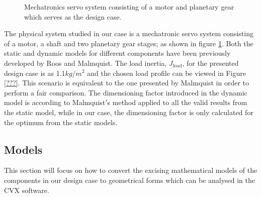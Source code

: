 
\begin{figure}[]
  \begin{center}
  \end{center}
  \caption{Mechatronics servo system consisting of a motor and planetary gear which serves as the design case.}
  \label{fig:CaseSystem}
\end{figure}

The physical system studied in our case is a mechatronic servo system consisting of a motor, a shaft and two planetary gear stages; as shown in figure \ref{fig:CaseSystem}. Both the static and dynamic models for different components have been previously developed by Roos and Malmquist. The load inertia, $J_{\text{load}}$, for the presented design case is as 1.1$kg/m^2$ and the chosen load profile can be viewed in Figure \ref{???}. This scenario is equivalent to the one presented by Malmquist in order to perform a fair comparison. The dimensioning factor introduced in the dynamic model is according to Malmquist$'$s method applied to all the valid results from the static model, while in our case, the dimensioning factor is only calculated for the optimum from the static models.


\subsection*{Models}
This section will focus on how to convert the excising mathematical models of the components in our design case to geometrical forms which can be analysed in the CVX software. 
